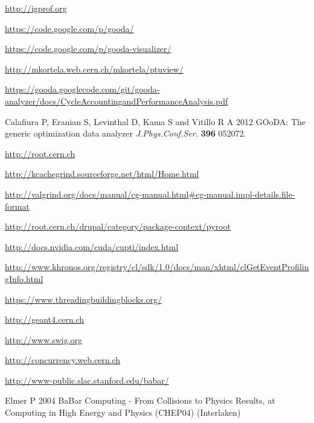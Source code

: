 \documentclass[notitlepage,letter,12pt]{article}
\begin{document}
\begin{thebibliography}{0}




 \url{http://igprof.org}

 \url{https://code.google.com/p/gooda/}

 \url{https://code.google.com/p/gooda-visualizer/}

 \url{http://mkortela.web.cern.ch/mkortela/ptuview/}

 \url{https://gooda.googlecode.com/git/gooda-analyzer/docs/CycleAccountingandPerformanceAnalysis.pdf}

 Calafiura P, Eranian S, Levinthal D, Kama S and Vitillo R A  2012 GOoDA: The generic optimization data analyzer {\it J.Phys.Conf.Ser.} {\bf 396} 052072.

 \url{http://root.cern.ch}

 \url{http://kcachegrind.sourceforge.net/html/Home.html}

 \url{http://valgrind.org/docs/manual/cg-manual.html\#cg-manual.impl-details.file-format}

 \url{http://root.cern.ch/drupal/category/package-context/pyroot}

 \url{http://docs.nvidia.com/cuda/cupti/index.html}

 \url{http://www.khronos.org/registry/cl/sdk/1.0/docs/man/xhtml/clGetEventProfilingInfo.html}

 \url{https://www.threadingbuildingblocks.org/}

 \url{http://geant4.cern.ch}

 \url{http://www.swig.org}

 \url{http://concurrency.web.cern.ch}

 \url{http://www-public.slac.stanford.edu/babar/}

 Elmer P 2004 BaBar Computing - From Collisions to Physics Results, at Computing in High Energy and Physics (CHEP04) (Interlaken)


\end{thebibliography}
\end{document}
